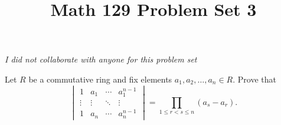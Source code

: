 \documentclass[11pt,letterpaper]{article}
\title{\textbf{Math 129 Problem Set 3}}
\begin{document}
\maketitle

\hr
\begin{center}
    \textit{I did not collaborate with anyone for this problem set}
\end{center}
\hr

\begin{cproblem}{2.19}
    Let $R$ be a commutative ring and fix elements $a_1,a_2,\ldots,a_n\in R$. Prove that 
    \[
        \begin{vmatrix}
        1 & a_1 & \cdots & a_1^{n-1}\\
        \vdots & \vdots & \ddots & \vdots\\
        1 & a_n & \cdots & a_n^{n-1}
        \end{vmatrix} = \prod_{1\leq r < s \leq n}(a_s-a_r).
    \] 
\end{cproblem}
\end{document}
